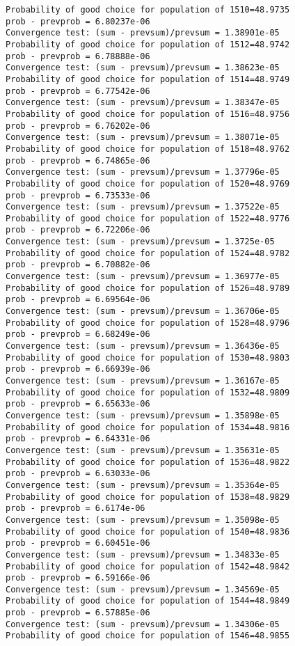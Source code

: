 \documentclass[11pt,onecolumn]{article}
\begin{document}
\begin{verbatim}
Probability of good choice for population of 1510=48.9735
prob - prevprob = 6.80237e-06
Convergence test: (sum - prevsum)/prevsum = 1.38901e-05
Probability of good choice for population of 1512=48.9742
prob - prevprob = 6.78888e-06
Convergence test: (sum - prevsum)/prevsum = 1.38623e-05
Probability of good choice for population of 1514=48.9749
prob - prevprob = 6.77542e-06
Convergence test: (sum - prevsum)/prevsum = 1.38347e-05
Probability of good choice for population of 1516=48.9756
prob - prevprob = 6.76202e-06
Convergence test: (sum - prevsum)/prevsum = 1.38071e-05
Probability of good choice for population of 1518=48.9762
prob - prevprob = 6.74865e-06
Convergence test: (sum - prevsum)/prevsum = 1.37796e-05
Probability of good choice for population of 1520=48.9769
prob - prevprob = 6.73533e-06
Convergence test: (sum - prevsum)/prevsum = 1.37522e-05
Probability of good choice for population of 1522=48.9776
prob - prevprob = 6.72206e-06
Convergence test: (sum - prevsum)/prevsum = 1.3725e-05
Probability of good choice for population of 1524=48.9782
prob - prevprob = 6.70882e-06
Convergence test: (sum - prevsum)/prevsum = 1.36977e-05
Probability of good choice for population of 1526=48.9789
prob - prevprob = 6.69564e-06
Convergence test: (sum - prevsum)/prevsum = 1.36706e-05
Probability of good choice for population of 1528=48.9796
prob - prevprob = 6.68249e-06
Convergence test: (sum - prevsum)/prevsum = 1.36436e-05
Probability of good choice for population of 1530=48.9803
prob - prevprob = 6.66939e-06
Convergence test: (sum - prevsum)/prevsum = 1.36167e-05
Probability of good choice for population of 1532=48.9809
prob - prevprob = 6.65633e-06
Convergence test: (sum - prevsum)/prevsum = 1.35898e-05
Probability of good choice for population of 1534=48.9816
prob - prevprob = 6.64331e-06
Convergence test: (sum - prevsum)/prevsum = 1.35631e-05
Probability of good choice for population of 1536=48.9822
prob - prevprob = 6.63033e-06
Convergence test: (sum - prevsum)/prevsum = 1.35364e-05
Probability of good choice for population of 1538=48.9829
prob - prevprob = 6.6174e-06
Convergence test: (sum - prevsum)/prevsum = 1.35098e-05
Probability of good choice for population of 1540=48.9836
prob - prevprob = 6.60451e-06
Convergence test: (sum - prevsum)/prevsum = 1.34833e-05
Probability of good choice for population of 1542=48.9842
prob - prevprob = 6.59166e-06
Convergence test: (sum - prevsum)/prevsum = 1.34569e-05
Probability of good choice for population of 1544=48.9849
prob - prevprob = 6.57885e-06
Convergence test: (sum - prevsum)/prevsum = 1.34306e-05
Probability of good choice for population of 1546=48.9855

\end{verbatim}
\end{document}
